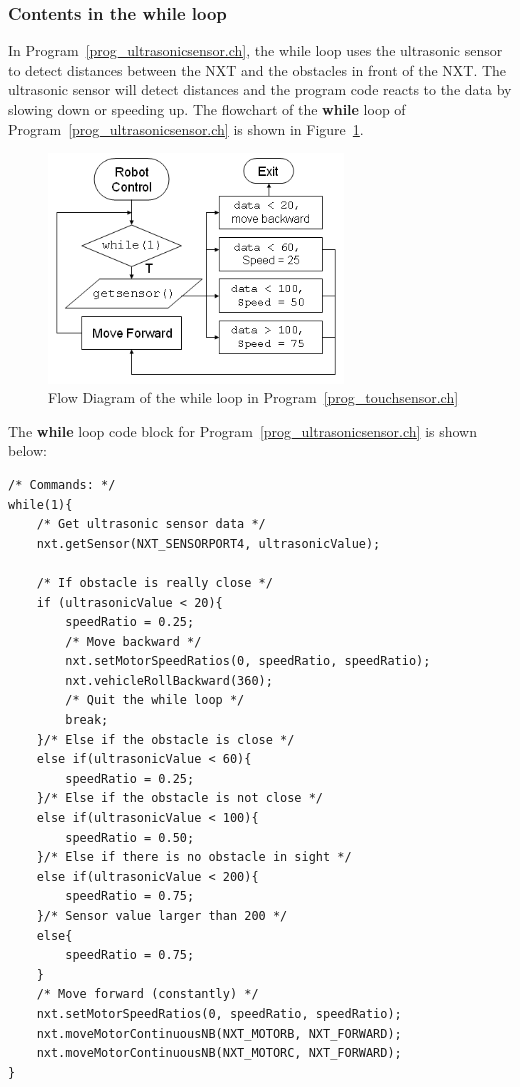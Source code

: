 \documentclass[11pt]{article}
\begin{document}
\subsubsection*{Contents in the while loop}
In Program~\ref{prog_ultrasonicsensor.ch}, the while loop uses the ultrasonic 
sensor to detect distances between the NXT and the obstacles in front of the 
NXT. The ultrasonic sensor will detect distances and the program code reacts 
to the data by slowing down or speeding up. The flowchart of the {\bf while} 
loop of Program~\ref{prog_ultrasonicsensor.ch} is shown in 
Figure~\ref{fig_NXT_ultraflow}.\\
\begin{figure}[h]
  \begin{center}
    \includegraphics[height=2.4in]{figure/mindstorm/NXT_ultraflow.png}
    \caption{Flow Diagram of the while loop in Program~\ref{prog_touchsensor.ch} 
    \label{fig_NXT_ultraflow}}
  \end{center}
\end{figure}
The {\bf while} loop code block for Program~\ref{prog_ultrasonicsensor.ch} is shown below:
\begin{lstlisting}
/* Commands: */
while(1){
    /* Get ultrasonic sensor data */
    nxt.getSensor(NXT_SENSORPORT4, ultrasonicValue);
        
    /* If obstacle is really close */
    if (ultrasonicValue < 20){
        speedRatio = 0.25;
        /* Move backward */
        nxt.setMotorSpeedRatios(0, speedRatio, speedRatio);
        nxt.vehicleRollBackward(360);
        /* Quit the while loop */
        break;
    }/* Else if the obstacle is close */
    else if(ultrasonicValue < 60){
        speedRatio = 0.25;
    }/* Else if the obstacle is not close */
    else if(ultrasonicValue < 100){
        speedRatio = 0.50;
    }/* Else if there is no obstacle in sight */
    else if(ultrasonicValue < 200){
        speedRatio = 0.75;
    }/* Sensor value larger than 200 */
    else{
        speedRatio = 0.75;
    }
    /* Move forward (constantly) */
    nxt.setMotorSpeedRatios(0, speedRatio, speedRatio);
    nxt.moveMotorContinuousNB(NXT_MOTORB, NXT_FORWARD);
    nxt.moveMotorContinuousNB(NXT_MOTORC, NXT_FORWARD);
}
\end{lstlisting}
\end{document}
